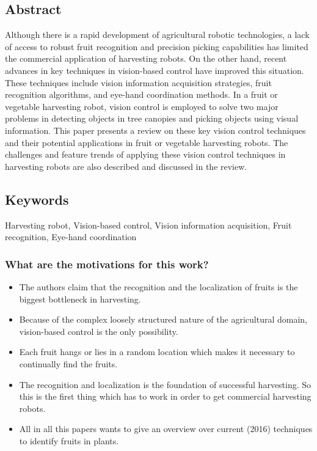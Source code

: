     \subsection*{Abstract}
    Although there is a rapid development of agricultural robotic technologies, a lack of access to robust fruit
    recognition and precision picking capabilities has limited the commercial application of harvesting
    robots. On the other hand, recent advances in key techniques in vision-based control have improved this
    situation. These techniques include vision information acquisition strategies, fruit recognition algorithms, and eye-hand coordination methods. In a fruit or vegetable harvesting robot, vision control is
    employed to solve two major problems in detecting objects in tree canopies and picking objects using
    visual information. This paper presents a review on these key vision control techniques and their potential applications in fruit or vegetable harvesting robots. The challenges and feature trends of applying
    these vision control techniques in harvesting robots are also described and discussed in the review.
    
    
    \subsection*{Keywords}
    Harvesting robot, Vision-based control, Vision information acquisition, Fruit recognition, Eye-hand coordination
    
    
     
    \subsubsection*{What are the motivations for this work?}
    \begin{itemize}
        \item The authors claim that the recognition and the localization of fruits is the biggest bottleneck in harvesting.
        \item Because of the complex loosely structured nature of the agricultural domain, vision-based control is the only possibility.
        \item Each fruit hangs or lies in a random location which makes it necessary to continually find the fruits. 
        \item The recognition and localization is the foundation of successful harvesting. So this is the first thing which has to work in order to get commercial harvesting robots. 
        \item All in all this papers wants to give an overview over current (2016) techniques to identify fruits in plants.
    \end{itemize}
